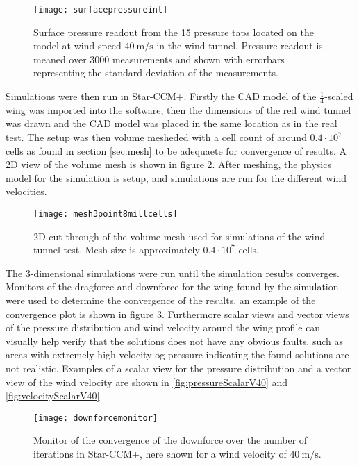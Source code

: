   \begin{figure}
    \texttt{[image: surfacepressureint]}
    \caption{Surface pressure readout from the 15 pressure taps located on the model at wind speed $\SI{40}{\metre\per\second}$ in the wind tunnel. Pressure readout is meaned over 3000 measurements and shown with errorbars representing the standard deviation of the measurements.}
    \label{fig:surfacepressureint}
  \end{figure}

  Simulations were then run in Star-CCM+. Firstly the CAD model of the $\frac{1}{4}$-scaled wing was imported into the software, then the dimensions of the red wind tunnel was drawn and the CAD model was placed in the same location as in the real test. The setup was then volume mesheded with a cell count of around $0.4 \cdot 10^{7}$ cells as found in section \ref{sec:mesh} to be adequaete for convergence of results. A 2D view of the volume mesh is shown in figure \ref{fig:mesh3point8mill}. After meshing, the physics model for the simulation is setup, and simulations are run for the different wind velocities.

  \begin{figure}
    \texttt{[image: mesh3point8millcells]}
    \caption{2D cut through of the volume mesh used for simulations of the wind tunnel test. Mesh size is approximately $0.4 \cdot 10^{7}$ cells.}
    \label{fig:mesh3point8mill}
  \end{figure}

  The 3-dimensional simulations were run until the simulation results converges. Monitors of the dragforce and downforce for the wing found by the simulation were used to determine the convergence of the results, an example of the convergence plot is shown in figure \ref{fig:downforcemonitor}. Furthermore scalar views and vector views of the pressure distribution and wind velocity around the wing profile can visually help verify that the solutions does not have any obvious faults, such as areas with extremely high velocity og pressure indicating the found solutions are not realistic. Examples of a scalar view for the pressure distribution and a vector view of the wind velocity are shown in \ref{fig:pressureScalarV40} and \ref{fig:velocityScalarV40}.

  \begin{figure}
    \texttt{[image: downforcemonitor]}
    \caption{Monitor of the convergence of the downforce over the number of iterations in Star-CCM+, here shown for a wind velocity of $\SI{40}{\metre\per\second}$.}
    \label{fig:downforcemonitor}
  \end{figure}

